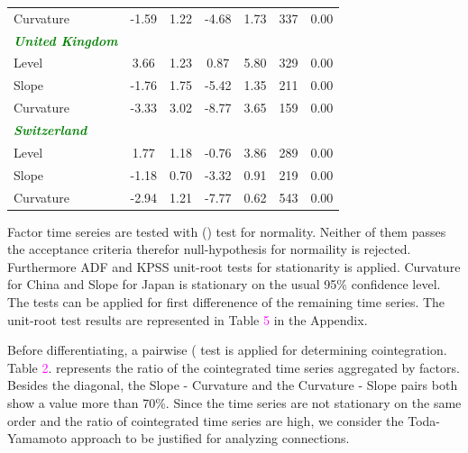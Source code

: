\documentclass[12pt,bibliography=totoc]{article}
\begin{document}
\begin{table}[H]
\begin{tabular}{l c c c c c c}
Curvature					&	-1.59	&	1.22	&	-4.68	&	1.73	&	337	&	0.00	\\
\textcolor{green}{\textit{\textbf{United Kingdom}}}		&		&		&		&		&		&		\\
Level						&	3.66	&	1.23	&	0.87	&	5.80	&	329	&	0.00	\\
Slope				&	-1.76	&	1.75	&	-5.42	&	1.35	&	211	&	0.00	\\
													
Curvature					&	-3.33	&	3.02	&	-8.77	&	3.65	&	159	&	0.00	\\
\textcolor{green}{\textit{\textbf{Switzerland}}}				&		&		&		&		&		&		\\
Level						&	1.77	&	1.18	&	-0.76	&	3.86	&	289	&	0.00	\\
Slope				&	-1.18	&	0.70	&	-3.32	&	0.91	&	219	&	0.00	\\
Curvature					&	-2.94	&	1.21	&	-7.77	&	0.62	&	543	&	0.00	\\

\hline%
\end{tabular}
\label{table:nonlin}%
\end{table}


\bigskip


Factor time sereies are tested with (\cite{bera1981efficient}) test for normality. Neither of them passes the acceptance criteria therefor null-hypothesis for normaility is rejected. Furthermore ADF and KPSS unit-root tests for stationarity is applied. Curvature for China and Slope for Japan is stationary on the usual 95\% confidence level. The tests can be applied for first differenence of the remaining time series. The unit-root test results are represented in Table \textcolor{magenta}{5} in the Appendix.

Before differentiating, a pairwise  (\cite{engle1987co} test is applied for determining cointegration. Table \textcolor{magenta}{2}. represents the ratio of the cointegrated time series aggregated by factors. Besides the diagonal, the Slope - Curvature and the Curvature - Slope pairs both show a value more than 70\%. Since the time series are not stationary on the same order and the ratio of cointegrated time series are high, we consider the Toda-Yamamoto approach to be justified for analyzing connections.
\end{document}
